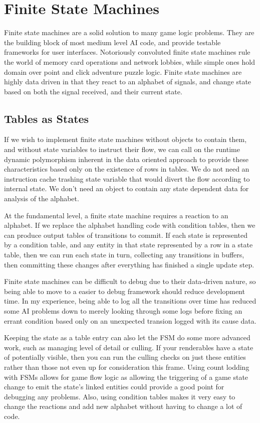 \chapter{Finite State Machines}

Finite state machines are a solid solution to many game logic problems. They
are the building block of most medium level AI code, and provide testable
frameworks for user interfaces. Notoriously convoluted finite state machines
rule the world of memory card operations and network lobbies, while simple ones
hold domain over point and click adventure puzzle logic. Finite state machines
are highly data driven in that they react to an alphabet of signals, and change
state based on both the signal received, and their current state.

\section{Tables as States}

If we wish to implement finite state machines without objects to contain them,
and without state variables to instruct their flow, we can call on the runtime
dynamic polymorphism inherent in the data oriented approach to provide
these characteristics based only on the existence of rows in tables. We do not
need an instruction cache trashing state variable that would divert the flow
according to internal state. We don't need an object to contain any state
dependent data for analysis of the alphabet.

At the fundamental level, a finite state machine requires a reaction to an
alphabet. If we replace the alphabet handling code with condition tables, then
we can produce output tables of transitions to commit. If each state is
represented by a condition table, and any entity in that state represented by a
row in a state table, then we can run each state in turn, collecting any
transitions in buffers, then committing these changes after everything has
finished a single update step.

Finite state machines can be difficult to debug due to their data-driven
nature, so being able to move to a easier to debug framework should reduce
development time. In my experience, being able to log all the transitions over
time has reduced some AI problems down to merely looking through some logs
before fixing an errant condition based only on an unexpected transion logged
with its cause data.

Keeping the state as a table entry can also let the FSM do some more advanced
work, such as managing level of detail or culling. If your renderables have a
state of potentially visible, then you can run the culling checks on just these
entities rather than those not even up for consideration this frame. Using
count lodding with FSMs allows for game flow logic as allowing the triggering
of a game state change to emit the state's linked entities could provide a good
point for debugging any problems. Also, using condition tables makes it very
easy to change the reactions and add new alphabet without having to change a
lot of code.

